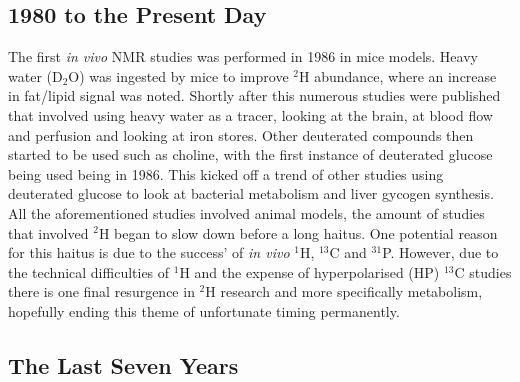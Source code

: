 \documentclass[class=article, crop=false]{standalone}
\begin{document}
\subsection{1980 to the Present Day}

The first \textit{in vivo} NMR studies was performed in 1986\cite{Brereton1986PreliminarySpectroscopy} in mice models. Heavy water (D$_2$O) was ingested by mice to improve $^2$H abundance, where an increase in fat/lipid signal was noted. Shortly after this numerous studies were published that involved using heavy water as a tracer, looking at the brain\cite{Ewy1988DeuteriumSitu}, at blood flow and perfusion\cite{Ackerman1987DeuteriumTracer.} and looking at iron stores\cite{Irving1987InSpectroscopy}. Other deuterated compounds then started to be used such as choline\cite{Eng1990RenalStudy}, with the first instance of deuterated glucose being used being in 1986\cite{Barrow1986NMRMobilis}. This kicked off a trend of other studies using deuterated glucose to look at bacterial metabolism\cite{Aguayo1988HighMetabolism.} and liver gycogen synthesis\cite{Goodman1989UseSynthesis}. All the aforementioned studies involved animal models, the amount of studies that involved $^2$H began to slow down before a long haitus. One potential reason for this haitus is due to the success' of \textit{in vivo} $^1$H\cite{Harada1984IdentificationScience}, $^{13}$C\cite{Cohen1980UseLiver} and $^{31}$P\cite{Sappey-Marinier1992EffectSpectroscopy}. However, due to the technical difficulties of $^1$H and the expense of hyperpolarised (HP) $^{13}$C studies there is one final resurgence in $^2$H research and more specifically metabolism, hopefully ending this theme of unfortunate timing permanently. 


\subsection{The Last Seven Years}
\end{document}
